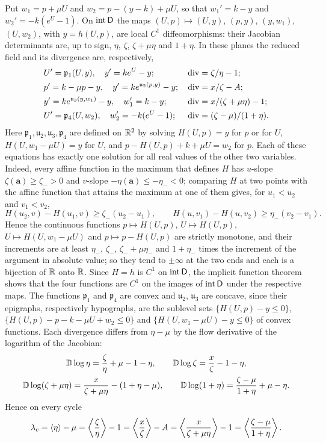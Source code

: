 \begin{remark}\label{att:rem:planes}
Put $w_1=p+\mu U$ and $w_2=p-(y-k)+\mu U$, so that $w_1'=k-y$ and $w_2'=-k(e^{U}-1)$. On $\operatorname{int}\mathsf D$ the maps $(U,p)\mapsto(U,y)$, $(p,y)$, $(y,w_1)$, $(U,w_2)$, with $y=h(U,p)$, are local $C^1$ diffeomorphisms: their Jacobian determinants are, up to sign, $\eta$, $\zeta$, $\zeta+\mu\eta$ and $1+\eta$. In these planes the reduced field and its divergence are, respectively,
\[
\begin{aligned}
&U'=\mathfrak p_1(U,y),\quad y'=ke^{U}-y;&&\operatorname{div}=\zeta/\eta-1;\\
&p'=k-\mu p-y,\quad y'=ke^{\mathfrak u_2(p,y)}-y;&&\operatorname{div}=x/\zeta-A;\\
&y'=ke^{\mathfrak u_3(y,w_1)}-y,\quad w_1'=k-y;&&\operatorname{div}=x/(\zeta+\mu\eta)-1;\\
&U'=\mathfrak p_4(U,w_2),\quad w_2'=-k(e^{U}-1);&&\operatorname{div}=(\zeta-\mu)/(1+\eta).
\end{aligned}
\]
Here $\mathfrak p_1,\mathfrak u_2,\mathfrak u_3,\mathfrak p_4$ are defined on $\mathbb R^2$ by solving $H(U,p)=y$ for $p$ or for $U$, $H(U,w_1-\mu U)=y$ for $U$, and $p-H(U,p)+k+\mu U=w_2$ for $p$. Each of these equations has exactly one solution for all real values of the other two variables. Indeed, every affine function in the maximum that defines $H$ has $u$-slope $\zeta(\mathbf a)\ge\zeta_->0$ and $v$-slope $-\eta(\mathbf a)\le-\eta_-<0$; comparing $H$ at two points with the affine function that attains the maximum at one of them gives, for $u_1<u_2$ and $v_1<v_2$,
\[
H(u_2,v)-H(u_1,v)\ge\zeta_-(u_2-u_1),\qquad H(u,v_1)-H(u,v_2)\ge\eta_-(v_2-v_1).
\]
Hence the continuous functions $p\mapsto H(U,p)$, $U\mapsto H(U,p)$, $U\mapsto H(U,w_1-\mu U)$ and $p\mapsto p-H(U,p)$ are strictly monotone, and their increments are at least $\eta_-$, $\zeta_-$, $\zeta_-+\mu\eta_-$ and $1+\eta_-$ times the increment of the argument in absolute value; so they tend to $\pm\infty$ at the two ends and each is a bijection of $\mathbb R$ onto $\mathbb R$. Since $H=h$ is $C^1$ on $\operatorname{int}\mathsf D$, the implicit function theorem shows that the four functions are $C^1$ on the images of $\operatorname{int}\mathsf D$ under the respective maps. The functions $\mathfrak p_1$ and $\mathfrak p_4$ are convex and $\mathfrak u_2$, $\mathfrak u_3$ are concave, since their epigraphs, respectively hypographs, are the sublevel sets $\{H(U,p)-y\le0\}$, $\{H(U,p)-p-k-\mu U+w_2\le0\}$ and $\{H(U,w_1-\mu U)-y\le0\}$ of convex functions. Each divergence differs from $\eta-\mu$ by the flow derivative of the logarithm of the Jacobian:
\begin{gather*}
\mathbb D\log\eta=\frac\zeta\eta+\mu-1-\eta,\qquad \mathbb D\log\zeta=\frac x\zeta-1-\eta,\\
\mathbb D\log(\zeta+\mu\eta)=\frac{x}{\zeta+\mu\eta}-(1+\eta-\mu),\qquad \mathbb D\log(1+\eta)=\frac{\zeta-\mu}{1+\eta}+\mu-\eta .
\end{gather*}
Hence on every cycle
\[
\lambda_c=\left\langle \eta\right\rangle-\mu=\left\langle \frac\zeta\eta\right\rangle-1=\left\langle \frac x\zeta\right\rangle-A=\left\langle \frac{x}{\zeta+\mu\eta}\right\rangle-1=\left\langle \frac{\zeta-\mu}{1+\eta}\right\rangle .
\]
\end{remark}
